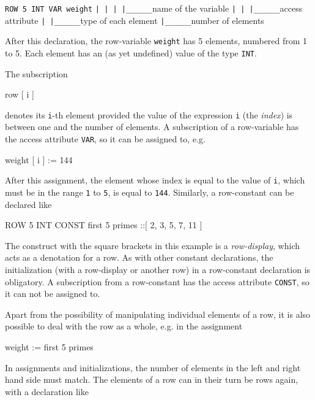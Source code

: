 \begin{literal}
        {\tt ROW 5 INT VAR weight}
        {\tt     |  |   |    |\_\_\_\_\_\_}name of the variable
        {\tt     |  |   |\_\_\_\_\_\_}access attribute
        {\tt     |  |\_\_\_\_\_\_}type of each element
        {\tt     |\_\_\_\_\_\_}number of elements
\end{literal}

\noindent
After this declaration, the row-variable {\tt weight} has 5 elements,
numbered from 1 to 5. Each element has an (as yet undefined)
value of the type {\tt INT}.

The subscription

\begin{elan}
        row [ i ]
\end{elan}

\noindent
denotes its {\tt i}-th element provided the value of the expression
{\tt i} (the {\em index}) is between one and the number of elements.
A subscription of a row-variable has the access attribute {\tt VAR},
so it can be assigned to, e.g.

\begin{elan}
        weight [ i ] := 144
\end{elan}

\noindent
After this assignment, the element whose index is equal to the
value of {\tt i}, which must be in the range {\tt 1} to {\tt 5},
is equal to {\tt 144}. Similarly, a row-constant can be declared like

\begin{elan}
        ROW 5 INT CONST first 5 primes ::[ 2, 3, 5, 7, 11 ]
\end{elan}

\noindent
The construct with the square brackets in this example is a {\em row-display},
which acts as a denotation for a row. As with other constant
declarations, the initialization (with a row-display or another
row) in a row-constant declaration is obligatory. A subscription
from a row-constant has the access attribute {\tt CONST}, so
it can not be assigned to.

Apart from the possibility of manipulating individual elements
of a row, it is also possible to deal with the row as a whole,
e.g. in the assignment

\begin{elan}
        weight := first 5 primes
\end{elan}

\noindent
In assignments and initializations, the number of elements in
the left and right hand side must match. The elements of a row
can in their turn be rows again, with a declaration like


